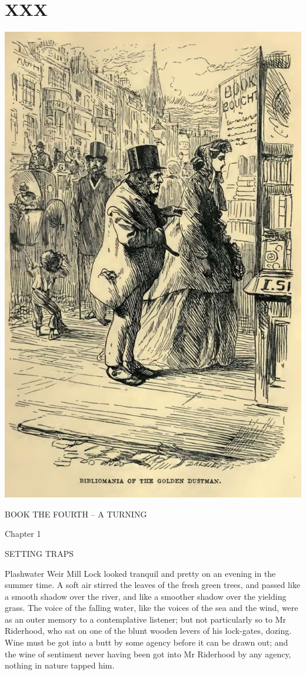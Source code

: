 
\chapter{XXX}

\includegraphics[scale=2.3]{03-05-01}

BOOK THE FOURTH -- A TURNING



Chapter 1

SETTING TRAPS


Plashwater Weir Mill Lock looked tranquil and pretty on an evening in
the summer time. A soft air stirred the leaves of the fresh green trees,
and passed like a smooth shadow over the river, and like a smoother
shadow over the yielding grass. The voice of the falling water, like
the voices of the sea and the wind, were as an outer memory to a
contemplative listener; but not particularly so to Mr Riderhood, who sat
on one of the blunt wooden levers of his lock-gates, dozing. Wine must
be got into a butt by some agency before it can be drawn out; and the
wine of sentiment never having been got into Mr Riderhood by any agency,
nothing in nature tapped him.

